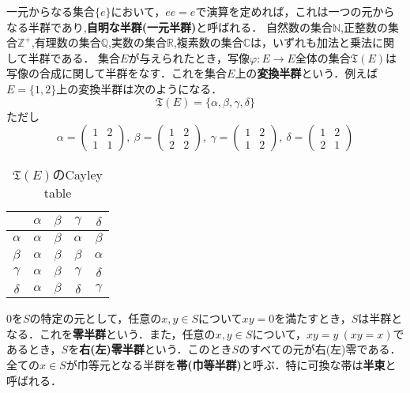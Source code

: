 一元からなる集合$\{e\}$において，$ee=e$で演算を定めれば，これは一つの元からなる半群であり,{\bf 自明な半群(一元半群)}と呼ばれる．
自然数の集合$\mathbb N$,正整数の集合$\mathbb Z^+$,有理数の集合$\mathbb Q$,実数の集合$\mathbb R$,複素数の集合$\mathbb C$は，いずれも加法と乗法に関して半群である．
集合$E$が与えられたとき，写像$\varphi:E\rightarrow E$全体の集合${\mathfrak T}(E)$は写像の合成に関して半群をなす．これを集合$E$上の{\bf 変換半群}という．例えば$E=\{1,2\}$上の変換半群は次のようになる．$${\mathfrak T}(E)=\{\alpha, \beta,\gamma,\delta\}$$
ただし
$$
\alpha=
\begin{pmatrix}
1&2 \\
1&1
\end{pmatrix}
,\:\beta=
\begin{pmatrix}
1&2 \\
2&2
\end{pmatrix}
,\:\gamma=
\begin{pmatrix}
1&2 \\
1&2
\end{pmatrix}
,\:\delta=
\begin{pmatrix}
1&2 \\
2&1
\end{pmatrix}
$$
\begin{table}[htb]
\begin{center}
\begin{tabular}{c|cccc}
 &$\alpha$&$\beta$&$\gamma$&$\delta$ \\ \hline
$\alpha$&$\alpha$&$\beta$&$\alpha$&$\beta$ \\
$\beta$&$\alpha$&$\beta$&$\beta$&$\alpha$ \\
$\gamma$&$\alpha$&$\beta$&$\gamma$&$\delta$ \\
$\delta$&$\alpha$&$\beta$&$\delta$&$\gamma$  
\end{tabular}
\caption{${\mathfrak T}(E)$のCayley table}
\end{center}
\end{table}
$0$を$S$の特定の元として，任意の$x,y\in S$について$xy=0$を満たすとき，$S$は半群となる．これを{\bf 零半群}という．また，任意の$x,y\in S$について，$xy=y\:(xy=x)$であるとき，$S$を{\bf 右(左)零半群}という．このとき$S$のすべての元が右(左)零である．
全ての$x\in S$が巾等元となる半群を{\bf 帯(巾等半群)}と呼ぶ．特に可換な帯は{\bf 半束}と呼ばれる．
